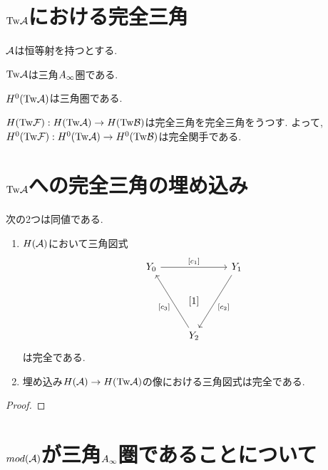 \documentclass[uplatex, a4paper, 14Q, dvipdfmx]{jsarticle}
\begin{document}
\section{\texorpdfstring{$\mathrm{Tw}\mathcal{A}$}{TwA}における完全三角}

$\mathcal{A}$は恒等射を持つとする. 

\begin{theorem}
  $\mathrm{Tw}\mathcal{A}$は三角$A_{\infty}$圏である.
\end{theorem}

\begin{theorem}
  $H^0(\mathrm{Tw}\mathcal{A})$は三角圏である.
\end{theorem}

\begin{lemma}
  $H(\mathrm{Tw}\mathcal{F}) : H(\mathrm{Tw}\mathcal{A}) \to H(\mathrm{Tw}\mathcal{B})$は完全三角を完全三角をうつす.
  よって, $H^0(\mathrm{Tw}\mathcal{F}) : H^0(\mathrm{Tw}\mathcal{A}) \to H^0(\mathrm{Tw}\mathcal{B})$は完全関手である.
\end{lemma}

\section{\texorpdfstring{$\mathrm{Tw}\mathcal{A}$}{TwA}への完全三角の埋め込み} \label{section_triangle_embedding_in_TwA}

\begin{lemma}
  次の2つは同値である.
  \begin{enumerate}
    \item $H(\mathcal{A})$において三角図式
    \[\begin{tikzcd}
      {Y_0} && {Y_1} \\
      & {[1]} \\
      & {Y_2}
      \arrow["{[c_1]}", from=1-1, to=1-3]
      \arrow["{[c_2]}", from=1-3, to=3-2]
      \arrow["{[c_3] }", from=3-2, to=1-1]
    \end{tikzcd}\]
    は完全である. 
    \item 埋め込み$H(\mathcal{A}) \to H(\mathrm{Tw}\mathcal{A})$の像における三角図式は完全である. 
  \end{enumerate}
\end{lemma}

\begin{proof}
  
\end{proof}

  

\section{\texorpdfstring{$mod (\mathcal{A})$}{mod(A)}が三角\texorpdfstring{$A_{\infty}$}{Ainf}圏であることについて}



\end{document}

